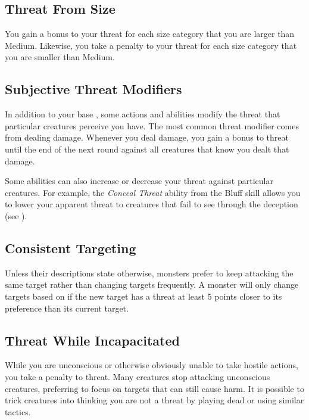         \subsection{Threat From Size}
            You gain a  bonus to your threat for each size category that you are larger than Medium.
            Likewise, you take a  penalty to your threat for each size category that you are smaller than Medium.

        \subsection{Subjective Threat Modifiers}
            In addition to your base , some actions and abilities modify the threat that particular creatures perceive you have.
            The most common threat modifier comes from dealing damage.
            Whenever you deal damage, you gain a  bonus to threat until the end of the next round against all creatures that know you dealt that damage.

            Some abilities can also increase or decrease your threat against particular creatures.
            For example, the \textit{Conceal Threat} ability from the Bluff skill allows you to lower your apparent threat to creatures that fail to see through the deception (see ).

        \subsection{Consistent Targeting}
            Unless their descriptions state otherwise, monsters prefer to keep attacking the same target rather than changing targets frequently.
            A monster will only change targets based on  if the new target has a threat at least 5 points closer to its preference than its current target.

        \subsection{Threat While Incapacitated}
            While you are unconscious or otherwise obviously unable to take hostile actions, you take a  penalty to threat.
            Many creatures stop attacking unconscious creatures, preferring to focus on targets that can still cause harm.
            It is possible to trick creatures into thinking you are not a threat by playing dead or using similar tactics.

